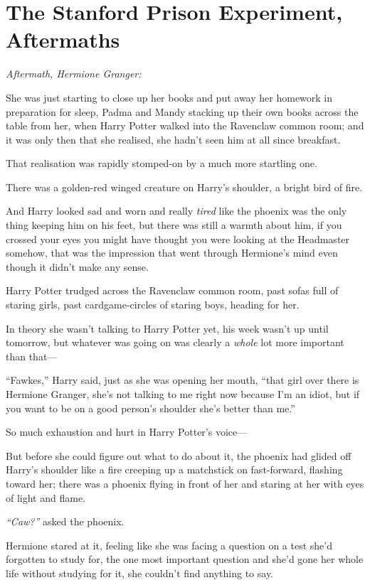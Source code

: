 \chapter{The Stanford Prison Experiment,
Aftermaths}\label{the-stanford-prison-experiment-aftermaths}

\emph{Aftermath, Hermione Granger:}

She was just starting to close up her books and put away her homework in
preparation for sleep, Padma and Mandy stacking up their own books
across the table from her, when Harry Potter walked into the Ravenclaw
common room; and it was only then that she realised, she hadn't seen him
at all since breakfast.

That realisation was rapidly stomped-on by a much more startling one.

There was a golden-red winged creature on Harry's shoulder, a bright
bird of fire.

And Harry looked sad and worn and really \emph{tired} like the phoenix
was the only thing keeping him on his feet, but there was still a warmth
about him, if you crossed your eyes you might have thought you were
looking at the Headmaster somehow, that was the impression that went
through Hermione's mind even though it didn't make any sense.

Harry Potter trudged across the Ravenclaw common room, past sofas full
of staring girls, past cardgame-circles of staring boys, heading for
her.

In theory she wasn't talking to Harry Potter yet, his week wasn't up
until tomorrow, but whatever was going on was clearly a \emph{whole} lot
more important than that---

``Fawkes,'' Harry said, just as she was opening her mouth, ``that girl
over there is Hermione Granger, she's not talking to me right now
because I'm an idiot, but if you want to be on a good person's shoulder
she's better than me.''

So much exhaustion and hurt in Harry Potter's voice---

But before she could figure out what to do about it, the phoenix had
glided off Harry's shoulder like a fire creeping up a matchstick on
fast-forward, flashing toward her; there was a phoenix flying in front
of her and staring at her with eyes of light and flame.

\emph{``Caw?''} asked the phoenix.

Hermione stared at it, feeling like she was facing a question on a test
she'd forgotten to study for, the one most important question and she'd
gone her whole life without studying for it, she couldn't find anything
to say.

